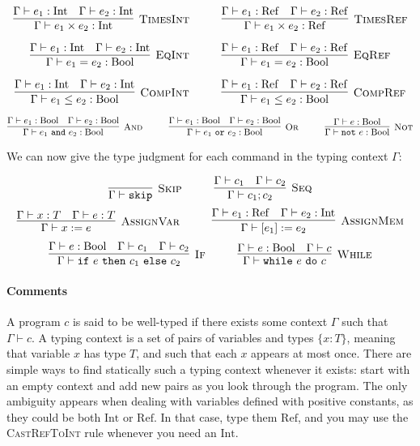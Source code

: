 \documentclass{article}
\newcommand{\Rule}[3]{\infer[\textsc{#1}]{#2}{#3}}
\newcommand{\Ref}{\mathrm{Ref}}
\newcommand{\Int}{\mathrm{Int}}
\newcommand{\Bool}{\mathrm{Bool}}
\begin{document}
\[
\Rule{TimesInt}{\Gamma \vdash e_1 \times e_2: \Int}{\Gamma \vdash e_1: \Int \quad \Gamma \vdash e_2: \Int}
\hspace*{1cm}
\Rule{TimesRef}{\Gamma \vdash e_1 \times e_2: \Ref}{\Gamma \vdash e_1: \Ref \quad \Gamma \vdash e_2: \Ref}
\]

\[
\Rule{EqInt}{\Gamma \vdash e_1 = e_2: \Bool}{\Gamma \vdash e_1: \Int \quad \Gamma \vdash e_2: \Int}
\hspace*{1cm}
\Rule{EqRef}{\Gamma \vdash e_1 = e_2: \Bool}{\Gamma \vdash e_1: \Ref \quad \Gamma \vdash e_2: \Ref}
\]

\[
\Rule{CompInt}{\Gamma \vdash e_1 \leq e_2: \Bool}{\Gamma \vdash e_1: \Int \quad \Gamma \vdash e_2: \Int}
\hspace*{1cm}
\Rule{CompRef}{\Gamma \vdash e_1 \leq e_2: \Bool}{\Gamma \vdash e_1: \Ref \quad \Gamma \vdash e_2: \Ref}
\]

\[
\Rule{And}{\Gamma \vdash e_1~\texttt{and}~e_2: \Bool}{\Gamma \vdash e_1: \Bool \quad \Gamma \vdash e_2: \Bool}
\hspace*{1cm}
\Rule{Or}{\Gamma \vdash e_1~\texttt{or}~e_2: \Bool}{\Gamma \vdash e_1: \Bool \quad \Gamma \vdash e_2: \Bool}
\hspace*{1cm}
\Rule{Not}{\Gamma \vdash \texttt{not}~e: \Bool}{\Gamma \vdash e: \Bool}
\]

We can now give the type judgment for each command in the typing context $\Gamma$:

\[
	\Rule{Skip}{\Gamma \vdash \texttt{skip}}{} \hspace*{1cm}
	\Rule{Seq}{\Gamma \vdash c_1 ; c_2}{\Gamma \vdash c_1 \quad \Gamma \vdash c_2}
\]
\[
	\Rule{AssignVar}{\Gamma \vdash x := e}{\Gamma \vdash x: T \quad \Gamma \vdash e: T} \hspace*{1cm}
	\Rule{AssignMem}{\Gamma \vdash [e_1] := e_2}{\Gamma \vdash e_1: \Ref \quad \Gamma \vdash e_2: \Int}
\]
\[
	\Rule{If}{\Gamma \vdash \texttt{if}~e~\texttt{then}~c_1~\texttt{else}~c_2}{\Gamma \vdash e: \Bool \quad \Gamma \vdash c_1 \quad \Gamma \vdash c_2}
\hspace*{1cm}
	\Rule{While}{\Gamma \vdash \texttt{while}~e~\texttt{do}~c}{\Gamma \vdash e: \Bool \quad \Gamma \vdash c} 
\]


\paragraph{Comments}

A program $c$ is said to be well-typed if there exists some context $\Gamma$ such that $\Gamma\vdash c$.
A typing context is a set of pairs of variables and types $\{x:T\}$, meaning that variable $x$ has type $T$, and such that each $x$ appears at most once.
There are simple ways to find statically such a typing context whenever it exists: start with an empty context and add new pairs as you look through the program. The only ambiguity appears when dealing with variables defined with positive constants, as they could be both $\Int$ or $\Ref$. In that case, type them $\Ref$, and you may use the \textsc{CastRefToInt} rule whenever you need an $\Int$.
\end{document}

